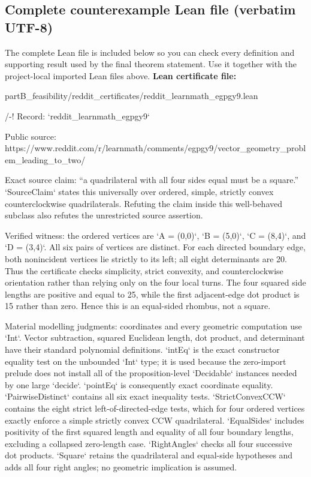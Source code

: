 \documentclass[11pt]{article}
\begin{document}
\subsection*{Complete counterexample Lean file (verbatim UTF-8)}
The complete Lean file is included below so you can check every definition and supporting result used by the final theorem statement. Use it together with the project-local imported Lean files above.
\textbf{Lean certificate file:}
\begin{Vsrc}
partB_feasibility/reddit_certificates/reddit_learnmath_egpgy9.lean
\end{Vsrc}
\begin{Vlean}
/-!
Record: `reddit_learnmath_egpgy9`

Public source:
https://www.reddit.com/r/learnmath/comments/egpgy9/vector_geometry_problem_leading_to_two/

Exact source claim: “a quadrilateral with all four sides equal must be a
square.”  `SourceClaim` states this universally over ordered, simple, strictly
convex counterclockwise quadrilaterals.  Refuting the claim inside this
well-behaved subclass also refutes the unrestricted source assertion.

Verified witness: the ordered vertices are `A = (0,0)`, `B = (5,0)`,
`C = (8,4)`, and `D = (3,4)`.  All six pairs of vertices are distinct.  For
each directed boundary edge, both nonincident vertices lie strictly to its
left; all eight determinants are 20.  Thus the certificate checks simplicity,
strict convexity, and counterclockwise orientation rather than relying only on
the four local turns.  The four squared side lengths are positive and equal to
25, while the first adjacent-edge dot product is 15 rather than zero.  Hence
this is an equal-sided rhombus, not a square.

Material modelling judgments: coordinates and every geometric computation use
`Int`.  Vector subtraction, squared Euclidean length, dot product, and
determinant have their standard polynomial definitions.  `intEq` is the exact
constructor equality test on the unbounded `Int` type; it is used because the
zero-import prelude does not install all of the proposition-level `Decidable`
instances needed by one large `decide`.  `pointEq` is consequently exact
coordinate equality.  `PairwiseDistinct` contains all six exact inequality
tests.  `StrictConvexCCW` contains the eight strict left-of-directed-edge
tests, which for four ordered vertices exactly enforce a simple strictly
convex CCW quadrilateral.  `EqualSides` includes positivity of the first
squared length and equality of all four boundary lengths, excluding a
collapsed zero-length case.  `RightAngles` checks all four successive dot
products.  `Square` retains the quadrilateral and equal-side hypotheses and
adds all four right angles; no geometric implication is assumed.


\end{Vlean}
\end{document}
